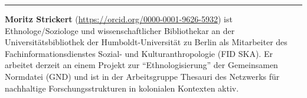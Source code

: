 \begin{center}\rule{0.5\linewidth}{0.5pt}\end{center}

\textbf{Moritz Strickert} (\url{https://orcid.org/0000-0001-9626-5932})
ist Ethnologe/Soziologe und wissenschaftlicher Bibliothekar an der
Universitätsbibliothek der Humboldt-Universität zu Berlin als
Mitarbeiter des Fachinformationsdienstes Sozial- und Kulturanthropologie
(FID SKA). Er arbeitet derzeit an einem Projekt zur \enquote{Ethnologisierung}
der Gemeinsamen Normdatei (GND) und ist in der Arbeitsgruppe Thesauri
des Netzwerks für nachhaltige Forschungsstrukturen in kolonialen
Kontexten aktiv.
